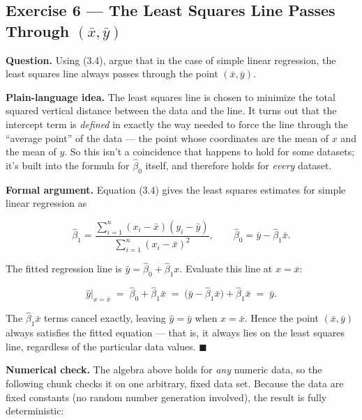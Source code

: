 \documentclass[
  11pt,
]{article}
\begin{document}
\newpage

\subsection{\texorpdfstring{Exercise 6 --- The Least Squares Line Passes
Through
\((\bar x,\bar y)\)}{Exercise 6 --- The Least Squares Line Passes Through (\textbackslash bar x,\textbackslash bar y)}}\label{exercise-6-the-least-squares-line-passes-through-bar-xbar-y}

\textbf{Question.} Using (3.4), argue that in the case of simple linear
regression, the least squares line always passes through the point
\((\bar x, \bar y)\).

\textbf{Plain-language idea.} The least squares line is chosen to
minimize the total squared vertical distance between the data and the
line. It turns out that the intercept term is \emph{defined} in exactly
the way needed to force the line through the ``average point'' of the
data --- the point whose coordinates are the mean of \(x\) and the mean
of \(y\). So this isn't a coincidence that happens to hold for some
datasets; it's built into the formula for \(\hat\beta_0\) itself, and
therefore holds for \emph{every} dataset.

\textbf{Formal argument.} Equation (3.4) gives the least squares
estimates for simple linear regression as

\[
\hat\beta_1 = \frac{\sum_{i=1}^n (x_i - \bar x)(y_i - \bar y)}{\sum_{i=1}^n (x_i - \bar x)^2},
\qquad
\hat\beta_0 = \bar y - \hat\beta_1 \bar x .
\]

The fitted regression line is \(\hat y = \hat\beta_0 + \hat\beta_1 x\).
Evaluate this line at \(x = \bar x\):

\[
\hat y \Big|_{x = \bar x} \;=\; \hat\beta_0 + \hat\beta_1 \bar x
\;=\; \big(\bar y - \hat\beta_1 \bar x\big) + \hat\beta_1 \bar x
\;=\; \bar y .
\]

The \(\hat\beta_1 \bar x\) terms cancel exactly, leaving
\(\hat y = \bar y\) when \(x = \bar x\). Hence the point
\((\bar x, \bar y)\) always satisfies the fitted equation --- that is,
it always lies on the least squares line, regardless of the particular
data values. \(\blacksquare\)

\textbf{Numerical check.} The algebra above holds for \emph{any} numeric
data, so the following chunk checks it on one arbitrary, fixed data set.
Because the data are fixed constants (no random number generation
involved), the result is fully deterministic:
\end{document}
